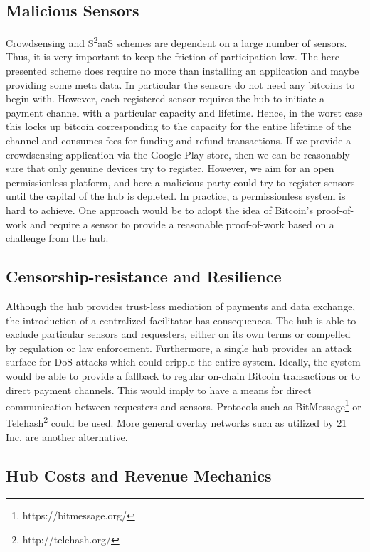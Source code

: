 \subsection{Malicious Sensors}
\label{sec:s2aas_micro_eval_malsens}

Crowdsensing and S\textsuperscript{2}aaS schemes are dependent on a large number of sensors. Thus, it is very important to keep the friction of participation low. The here presented scheme does require no more than installing an application and maybe providing some meta data. In particular the sensors do not need any bitcoins to begin with. However, each registered sensor requires the hub to initiate a payment channel with a particular capacity and lifetime. Hence, in the worst case this locks up bitcoin corresponding to the capacity for the entire lifetime of the channel and consumes fees for funding and refund transactions. If we provide a crowdsensing application via the Google Play store, then we can be reasonably sure that only genuine devices try to register. However, we aim for an open permissionless platform, and here a malicious party could try to register sensors until the capital of the hub is depleted. In practice, a permissionless system is hard to achieve. One approach would be to adopt the idea of Bitcoin's proof-of-work and require a sensor to provide a reasonable proof-of-work based on a challenge from the hub.

\subsection{Censorship-resistance and Resilience}

Although the hub provides trust-less mediation of payments and data exchange, the introduction of a centralized facilitator has consequences. The hub is able to exclude particular sensors and requesters, either on its own terms or compelled by regulation or law enforcement. Furthermore, a single hub provides an attack surface for \ac{DoS} attacks which could cripple the entire system. Ideally, the system would be able to provide a fallback to regular on-chain Bitcoin transactions or to direct payment channels. This would imply to have a means for direct communication between requesters and sensors. Protocols such as BitMessage\footnote{https://bitmessage.org/} or Telehash\footnote{http://telehash.org/} could be used. More general overlay networks such as utilized by 21 Inc. are another alternative.

\subsection{Hub Costs and Revenue Mechanics}
\label{sec:hubbiz}

